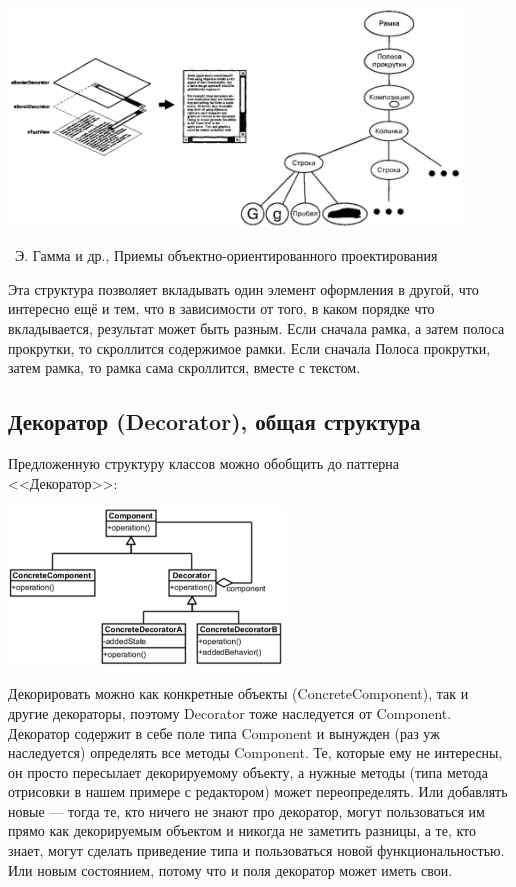 \documentclass[a5paper]{article}
\newcommand{\attribution}[1] {
    \vspace{-5mm}\begin{flushright}\begin{scriptsize}%
    {\textcopyright\, #1}\end{scriptsize}\end{flushright}
}
\begin{document}
\begin{center}
    \includegraphics[width=0.9\textwidth]{glyphStructure.png}
    \attribution{Э. Гамма и др., Приемы объектно-ориентированного проектирования}
\end{center}

Эта структура позволяет вкладывать один элемент оформления в другой, что интересно ещё и тем, что в зависимости от того, в каком порядке что вкладывается, результат может быть разным. Если сначала рамка, а затем полоса прокрутки, то скроллится содержимое рамки. Если сначала Полоса прокрутки, затем рамка, то рамка сама скроллится, вместе с текстом.

\subsection{Декоратор (Decorator), общая структура}

Предложенную структуру классов можно обобщить до паттерна <<Декоратор>>:

\begin{center}
    \includegraphics[width=0.55\textwidth]{decorator.png}
\end{center}

Декорировать можно как конкретные объекты (ConcreteComponent), так и другие декораторы, поэтому Decorator тоже наследуется от Component. Декоратор содержит в себе поле типа Component и вынужден (раз уж наследуется) определять все методы Component. Те, которые ему не интересны, он просто пересылает декорируемому объекту, а нужные методы (типа метода отрисовки в нашем примере с редактором) может переопределять. Или добавлять новые --- тогда те, кто ничего не знают про декоратор, могут пользоваться им прямо как декорируемым объектом и никогда не заметить разницы, а те, кто знает, могут сделать приведение типа и пользоваться новой функциональностью. Или новым состоянием, потому что и поля декоратор может иметь свои.
\end{document}
